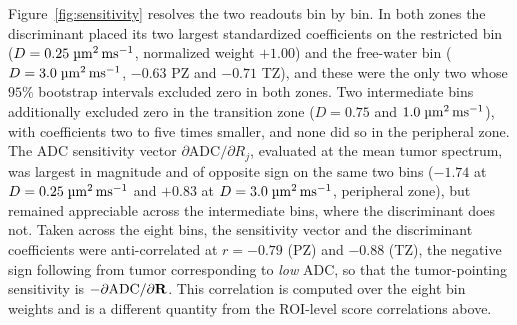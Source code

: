 Figure~\ref{fig:sensitivity} resolves the two readouts bin by bin.
In both zones the discriminant placed its two largest standardized coefficients on the restricted bin ($D = 0.25\;\si{\micro\meter\squared\per\milli\second}$, normalized weight $+1.00$) and the free-water bin ($D = 3.0\;\si{\micro\meter\squared\per\milli\second}$, $-0.63$ PZ and $-0.71$ TZ), and these were the only two whose $95\%$ bootstrap intervals excluded zero in both zones. Two intermediate bins additionally excluded zero in the transition zone ($D = 0.75$ and $1.0\;\si{\micro\meter\squared\per\milli\second}$), with coefficients two to five times smaller, and none did so in the peripheral zone.
The ADC sensitivity vector $\partial\text{ADC}/\partial R_j$, evaluated at the mean tumor spectrum, was largest in magnitude and of opposite sign on the same two bins ($-1.74$ at $D = 0.25\;\si{\micro\meter\squared\per\milli\second}$ and $+0.83$ at $D = 3.0\;\si{\micro\meter\squared\per\milli\second}$, peripheral zone), but remained appreciable across the intermediate bins, where the discriminant does not.
Taken across the eight bins, the sensitivity vector and the discriminant coefficients were anti-correlated at $r = -0.79$ (PZ) and $-0.88$ (TZ), the negative sign following from tumor corresponding to \emph{low} ADC, so that the tumor-pointing sensitivity is $-\partial\text{ADC}/\partial\mathbf{R}$. This correlation is computed over the eight bin weights and is a different quantity from the ROI-level score correlations above.
